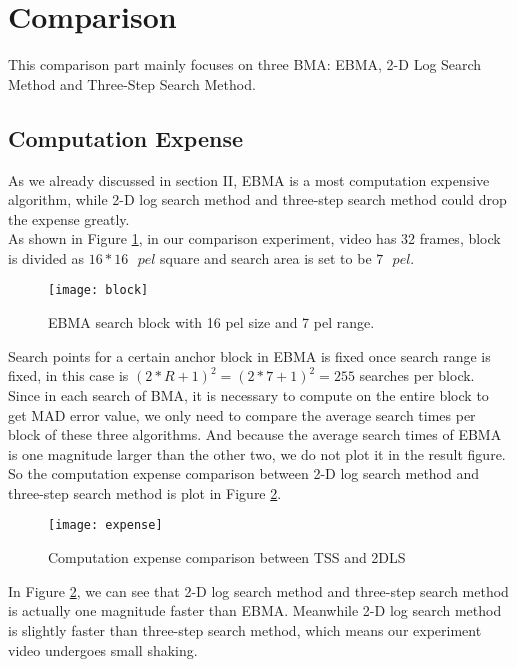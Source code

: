 \documentclass[a4paper, twocolumn]{article}
\begin{document}
	\section{Comparison}
	This comparison part mainly focuses on three BMA: EBMA, 2-D Log Search Method and Three-Step Search Method.
	\subsection{Computation Expense}
	As we already discussed in section II, EBMA is a most computation expensive algorithm, while 2-D log search method and three-step search method could drop the expense greatly. \\
	 As shown in Figure \ref{fig:block}, in our comparison experiment, video has 32 frames, block is divided as $ 16*16 \textit{ } pel $ square and search area is set to be $ 7 \textit{ } pel $.\\
	\begin{figure}[hb]
	\centering
	\texttt{[image: block]}
	\caption{EBMA search block with 16 pel size and 7 pel range.}
	\label{fig:block}
	\end{figure}
	
	\noindent
	Search points for a certain anchor block in EBMA is fixed once search range is fixed, in this case is $ (2*R+1)^2 = (2*7+1)^2=255 $ searches per block.\\
	Since in each search of BMA, it is necessary to compute on the entire block to get MAD error value, we only need to compare the average search times per block of these three algorithms. And because the average search times of EBMA is one magnitude larger than the other two, we do not plot it in the result figure. So the computation expense comparison between 2-D log search method and three-step search method is plot in Figure \ref{fig:expense}.
	\begin{figure}[h]
	\centering
	\texttt{[image: expense]}
	\caption{Computation expense comparison between TSS and 2DLS}
	\label{fig:expense}
	\end{figure}
	
	\noindent
	In Figure \ref{fig:expense}, we can see that 2-D log search method and three-step search method is actually one magnitude faster than EBMA. Meanwhile 2-D log search method is slightly faster than three-step search method, which means our experiment video undergoes small shaking.
	
\end{document}
